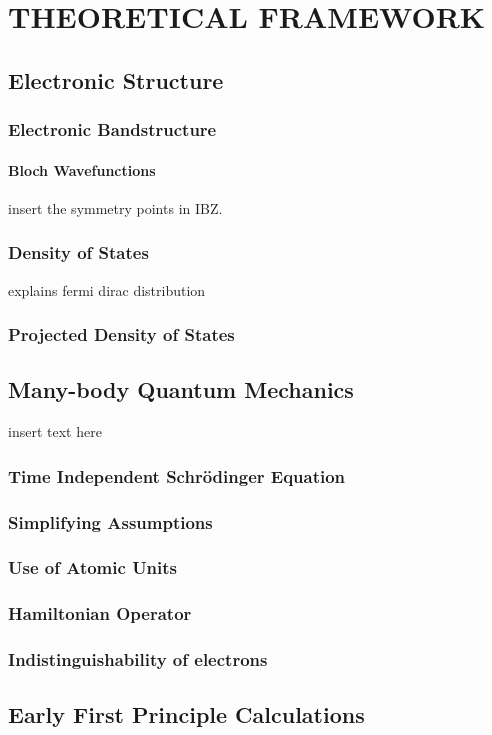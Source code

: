 \chapter{THEORETICAL FRAMEWORK}
\section{Electronic Structure}
    \subsection{Electronic Bandstructure}
        \subsubsection{Bloch Wavefunctions}
        insert the symmetry points in IBZ.
    \subsection{Density of States}
    explains fermi dirac distribution
    \subsection{Projected Density of States}
\section{Many-body Quantum Mechanics}
insert text here
    \subsection{Time Independent Schr{\"o}dinger Equation}
    \subsection{Simplifying Assumptions}
    \subsection{Use of Atomic Units}
    \subsection{Hamiltonian Operator}
\subsection{Indistinguishability of electrons}
\section{Early First Principle Calculations}
